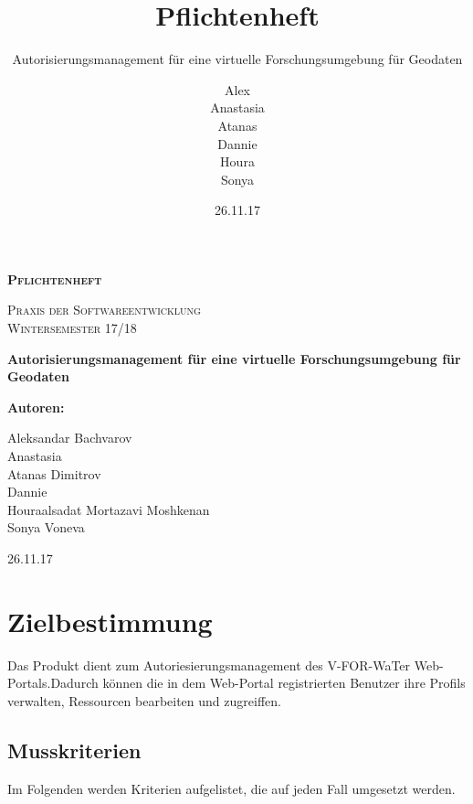 \documentclass[parskip=full,11pt]{scrartcl}
\title{Pflichtenheft}
\subtitle{Autorisierungsmanagement für eine virtuelle Forschungsumgebung für Geodaten}
\author{Alex\\Anastasia\\Atanas\\Dannie\\ Houra\\Sonya\\}
\date{26.11.17}
\begin{document}
\begin{titlepage}
	
	\begin{center}
	{\scshape\LARGE\bfseries Pflichtenheft \par}
	\vspace{1cm}
	{\scshape\Large Praxis der Softwareentwicklung\\}
	\vspace{1cm}
	{\scshape\Large Wintersemester 17/18\\}
	\vspace{3cm}
	{\huge\bfseries Autorisierungsmanagement für eine virtuelle Forschungsumgebung für Geodaten\par}
	\vspace{2cm}
	\vfill
	{\bfseries {\Large Autoren}:\par}
	{\Large Aleksandar Bachvarov}\\
	{\Large Anastasia}\\%
	{\Large Atanas Dimitrov}\\
	{\Large Dannie}\\%
	{\Large Houraalsadat Mortazavi Moshkenan}\\
	{\Large Sonya Voneva}\\
	\vfill
	{\large 26.11.17 \par}
	\end{center}
\end{titlepage}
\tableofcontents

\newpage
\section{Zielbestimmung}
Das Produkt dient zum Autoriesierungsmanagement des \gls{V-FOR-WaTer} Web-Portals.Dadurch können die in dem \gls{Web-Portal} registrierten \gls{Benutzer} ihre Profils verwalten, Ressourcen bearbeiten und zugreiffen.

\subsection{Musskriterien}
Im Folgenden werden Kriterien aufgelistet, die auf jeden Fall umgesetzt werden.
\end{document}
